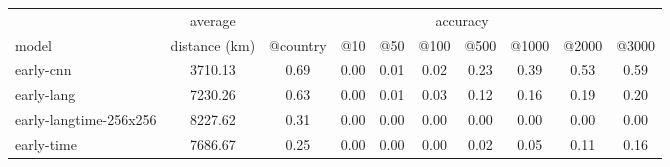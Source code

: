 
\begin{tabular}{l|c|cccccccc}
& average &\multicolumn{8}{c}{accuracy} \\
model & distance (km) & @country & @10 & @50 & @100 & @500 & @1000 & @2000 & @3000 \\
\hline
\hline
early-cnn & 3710.13 & 0.69 & 0.00 & 0.01 & 0.02 & 0.23 & 0.39 & 0.53 & 0.59 \\
 early-lang & 7230.26 & 0.63 & 0.00 & 0.01 & 0.03 & 0.12 & 0.16 & 0.19 & 0.20 \\
 early-langtime-256x256 & 8227.62 & 0.31 & 0.00 & 0.00 & 0.00 & 0.00 & 0.00 & 0.00 & 0.00 \\
 early-time & 7686.67 & 0.25 & 0.00 & 0.00 & 0.00 & 0.02 & 0.05 & 0.11 & 0.16 \\
 \end{tabular}